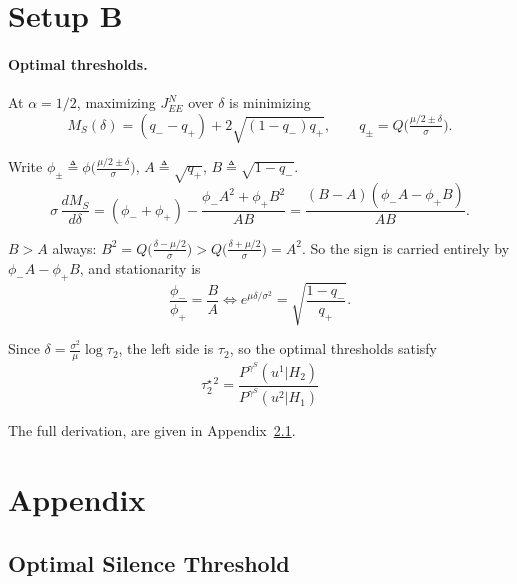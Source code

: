 \documentclass[11pt]{article}
\begin{document}
\section{Setup B}


\paragraph{Optimal thresholds.}
At $\alpha=1/2$, maximizing $J^N_{EE}$ over $\delta$ is minimizing
\begin{equation}
M_S(\delta)=(q_--q_+)+2\sqrt{(1-q_-)q_+},\qquad
q_\pm=Q\!\Big(\tfrac{\mu/2\pm\delta}{\sigma}\Big).
\label{eq:MS_of_delta}
\end{equation}

Write $\phi_\pm\triangleq\phi\!\big(\tfrac{\mu/2\pm\delta}{\sigma}\big)$,
$A\triangleq\sqrt{q_+}$, $B\triangleq\sqrt{1-q_-}$. 
\begin{equation}
\sigma\,\frac{dM_S}{d\delta}
=(\phi_-+\phi_+)-\frac{\phi_-A^2+\phi_+B^2}{AB}
=\frac{(B-A)(\phi_-A-\phi_+B)}{AB}.
\label{eq:dMS}
\end{equation}

$B>A$ always: $B^2=Q\!\big(\tfrac{\delta-\mu/2}{\sigma}\big)>Q\!\big(\tfrac{\delta+\mu/2}{\sigma}\big)=A^2$.
So the sign is carried entirely by $\phi_-A-\phi_+B$, and stationarity is
\begin{equation}
\frac{\phi_-}{\phi_+}=\frac{B}{A}
\iff
e^{\mu\delta/\sigma^2}=\sqrt{\frac{1-q_-}{q_+}} .
\label{eq:opt_delta}
\end{equation}

Since $\delta=\frac{\sigma^2}{\mu}\log\tau_2$, the left side is $\tau_2$, so the optimal
thresholds satisfy
\begin{equation}
\boxed{\;\tau_2^{\star\,2}=\frac{P^{\gamma^S}(u^1|H_2)}{P^{\gamma^S}(u^2|H_1)}\;}
\label{eq:opt_tau}
\end{equation}

The full derivation, are given in
Appendix~\ref{app:delta}.

\section{Appendix}


\subsection{Optimal Silence Threshold}
\label{app:delta}
\end{document}
